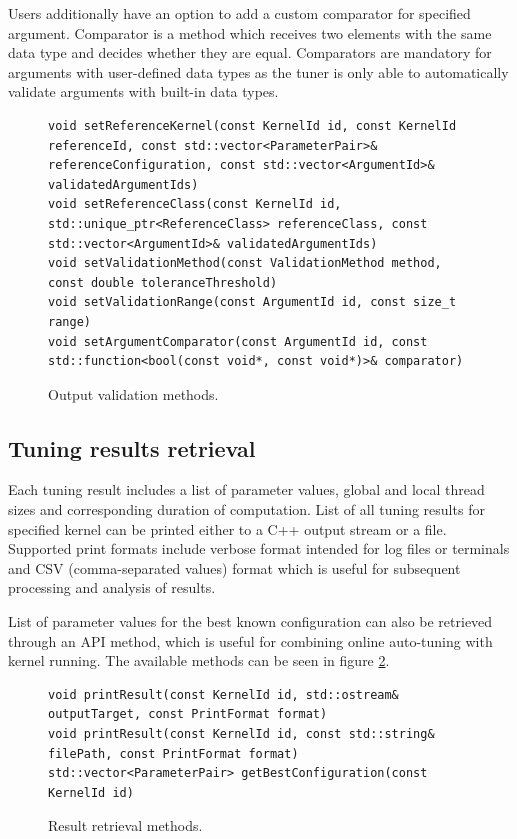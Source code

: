 \documentclass
[
    digital, %
    oneside, %
    table, %
    nolof, %
    nolot, %
    nocover %
]{fithesis3}
\begin{document}
Users additionally have an option to add a custom comparator for specified argument. Comparator is a method which receives two elements with the same
data type and decides whether they are equal. Comparators are mandatory for arguments with user-defined data types as the tuner is only able to
automatically validate arguments with built-in data types.

\begin{figure}
\begin{adjustwidth}{-1cm}{-1cm}
\begin{lstlisting}
void setReferenceKernel(const KernelId id, const KernelId referenceId, const std::vector<ParameterPair>& referenceConfiguration, const std::vector<ArgumentId>& validatedArgumentIds)
void setReferenceClass(const KernelId id, std::unique_ptr<ReferenceClass> referenceClass, const std::vector<ArgumentId>& validatedArgumentIds)
void setValidationMethod(const ValidationMethod method, const double toleranceThreshold)
void setValidationRange(const ArgumentId id, const size_t range)
void setArgumentComparator(const ArgumentId id, const std::function<bool(const void*, const void*)>& comparator)
\end{lstlisting}
\caption{Output validation methods.}
\label{ktt-validation-methods}
\end{adjustwidth}
\end{figure}

\subsection{Tuning results retrieval}
Each tuning result includes a list of parameter values, global and local thread sizes and corresponding duration of computation. List of all tuning
results for specified kernel can be printed either to a C++ output stream or a file. Supported print formats include verbose format intended for log
files or terminals and CSV (comma-separated values) format which is useful for subsequent processing and analysis of results.

List of parameter values for the best known configuration can also be retrieved through an API method, which is useful for combining online
auto-tuning with kernel running. The available methods can be seen in figure \ref{ktt-result-methods}.

\begin{figure}
\begin{adjustwidth}{-1cm}{-1cm}
\begin{lstlisting}
void printResult(const KernelId id, std::ostream& outputTarget, const PrintFormat format)
void printResult(const KernelId id, const std::string& filePath, const PrintFormat format)
std::vector<ParameterPair> getBestConfiguration(const KernelId id)
\end{lstlisting}
\caption{Result retrieval methods.}
\label{ktt-result-methods}
\end{adjustwidth}
\end{figure}
\end{document}
